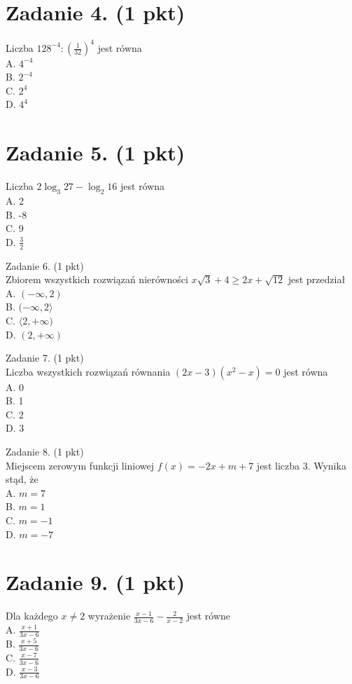 \documentclass[10pt]{article}
\begin{document}
\section*{Zadanie 4. (1 pkt)}
Liczba \(128^{-4}:\left(\frac{1}{32}\right)^{4}\) jest równa\\
A. \(4^{-4}\)\\
B. \(2^{-4}\)\\
C. \(2^{4}\)\\
D. \(4^{4}\)

\section*{Zadanie 5. (1 pkt)}
Liczba \(2 \log _{3} 27-\log _{2} 16\) jest równa\\
A. 2\\
B. -8\\
C. 9\\
D. \(\frac{3}{2}\)

Zadanie 6. (1 pkt)\\
Zbiorem wszystkich rozwiązań nierówności \(x \sqrt{3}+4 \geq 2 x+\sqrt{12}\) jest przedział\\
A. \((-\infty, 2)\)\\
B. \((-\infty, 2\rangle\)\\
C. \(\langle 2,+\infty)\)\\
D. \((2,+\infty)\)

Zadanie 7. (1 pkt)\\
Liczba wszystkich rozwiązań równania \((2 x-3)\left(x^{2}-x\right)=0\) jest równa\\
A. 0\\
B. 1\\
C. 2\\
D. 3

Zadanie 8. (1 pkt)\\
Miejscem zerowym funkcji liniowej \(f(x)=-2 x+m+7\) jest liczba 3. Wynika stąd, że\\
A. \(m=7\)\\
B. \(m=1\)\\
C. \(m=-1\)\\
D. \(m=-7\)

\section*{Zadanie 9. (1 pkt)}
Dla każdego \(x \neq 2\) wyrażenie \(\frac{x-1}{3 x-6}-\frac{2}{x-2}\) jest równe\\
A. \(\frac{x+1}{3 x-6}\)\\
B. \(\frac{x+5}{3 x-6}\)\\
C. \(\frac{x-7}{3 x-6}\)\\
D. \(\frac{x-3}{3 x-6}\)
\end{document}
